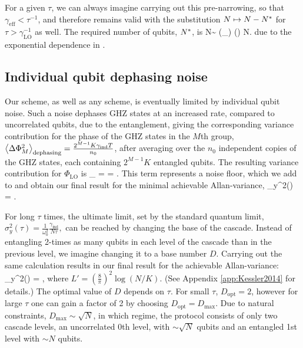 For a given $\tau$, we can always imagine carrying out this pre-narrowing, so
that $\gamma_\mathrm{eff} < \tau^{-1}$, and therefore  remains
valid with the substitution $N\mapsto N-N^\ast$ for $\tau >
\gamma_\mathrm{LO}^{-1}$ as well. The required number of qubits, $N^\ast$, is
\bel
	N\s \sim
	\log(\gamma_\tau)
	\log\left(\right) \ll N.
\eel
due to the exponential dependence in .


\subsection{Individual qubit dephasing noise}
Our scheme, as well as any scheme, is eventually limited by individual qubit
noise. Such a noise dephases GHZ states at an increased rate, compared to
uncorrelated qubits, due to the entanglement, giving the corresponding variance
contribution for the phase of the GHZ states in the $M$th group, 
$\left< \Delta\Phi^2_{M} \right>_\mathrm{dephasing} =  \frac{2^{M-1}
K\gamma_\mathrm{ind}T}{n_0}$, after averaging over the $n_0$ independent copies of the GHZ states, each
containing $2^{M-1} K$ entangled qubits. The resulting variance
contribution for $\Phi_\mathrm{LO}$ is
\bel
	\label{eq:Dephasing_GHZ 2}
	_ =
	 = .
\eel
This term represents a noise floor, which we add to
 and obtain our final result for the minimal achievable
Allan-variance,
\bel
	\label{eq:Final sigma_y}
	\sigma_y^2(\tau) = .
\eel

For long $\tau$ times, the ultimate limit, set by the standard quantum limit,
$
	\sigma_y^2(\tau) = \frac{1}{\omega_0^2}
	\frac{\gamma_\mathrm{ind}}{N\tau},
$
can be reached by changing the base of the cascade. Instead of entangling
2-times as many qubits in each level of the cascade than in the previous level,
we imagine changing it to a base number $D$. Carrying out the same calculation
results in our final result for the achievable Allan-variance:
\bel
	\sigma_y^2(\tau) =
	,
\eel
where $L' = \left(\frac{8}{\pi}\right)^2 \log(N/K)$.
(See Appendix \ref{app:Kessler2014} for details.)
The optimal value of $D$ depends on $\tau$. For small $\tau$, $D_\mathrm{opt} =
2$, however for large $\tau$ one can gain a factor of 2 by choosing $D_\mathrm{opt} = D_\mathrm{max}$. Due to natural
constraints, $D_\mathrm{max} \sim \sqrt{N}$, in which regime, the protocol
consists of only two cascade levels, an uncorrelated 0th level, with $\sim
\sqrt{N}$ qubits and an entangled 1st level with $\sim N$ qubits.

